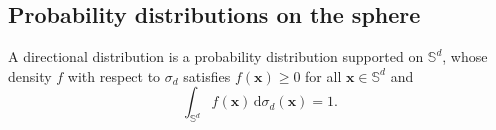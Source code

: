 \documentclass[12pt]{report} %
\newcommand{\bX}{\mathbf{X}}
\newcommand{\bx}{\mathbf{x}}
\newcommand{\bmu}{\boldsymbol{\mu}}
\newcommand{\bxi}{\boldsymbol{\xi}}
\newcommand{\sigmad}{\sigma_{d}}
\newcommand{\sigmadm}{\sigma_{d-1}}
\newcommand{\rd}{\mathrm{d}}
\newcommand{\Sd}{\mathbb{S}^{d}}
\newcommand{\Sdm}{\mathbb{S}^{d-1}}
\newcommand{\bB}{\mathbf{B}}
\begin{document}

\subsection*{Probability distributions on the sphere}

A directional distribution is a probability distribution supported on $\mathbb{S}^d$, whose density $f$ with respect to $\sigmad$ satisfies $f(\bx)\geq 0$ for all $\bx\in\mathbb{S}^d$ and
\begin{equation*}
    \int_{\mathbb{S}^d} f(\bx)\,\rd\sigmad(\bx) = 1.
\end{equation*}
\end{document}
